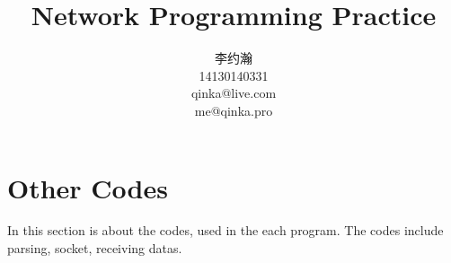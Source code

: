 \documentclass{article}
\title{Network Programming Practice}
\author{李约瀚 \\ 14130140331 \\ qinka@live.com \\ me@qinka.pro}
\newcounter{codeline}
\def\inputHaskell#1{\setcounter{codeline}{1}\setcounter{codeline}{1}}
\begin{document}
    \maketitle
    \newpage
    \tableofcontents
    \newpage
    \inputHaskell{src/Network/Netutils/WWW.lhs}
    \inputHaskell{src/Network/Netutils/FTP.lhs}
    \inputHaskell{src/Network/Netutils/POP.lhs}
    \inputHaskell{src/Network/Netutils/ScanIP.lhs}
    \inputHaskell{src/Network/Netutils/ScanPort.lhs}

    \section{Other Codes}
    \label{sec:oc}
    
    In this section is about the codes, used in the each program.
    The codes include parsing, socket, receiving datas.
    
    \inputHaskell{app/Main.lhs}
    \inputHaskell{src/Network/Netutils/}
\end{document}
